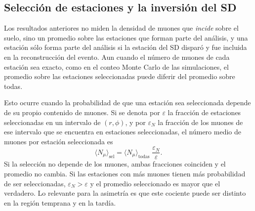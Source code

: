 
\subsection{Selección de estaciones y la inversión del SD}
\label{subsec:seleccion_estaciones}

Los resultados anteriores no miden la densidad de muones que \textit{incide} sobre el suelo, sino un promedio sobre las estaciones que forman parte del análisis, y una estación sólo forma parte del análisis si la estación del SD disparó y fue incluida en la reconstrucción del evento. Aun cuando el número de muones de cada estación sea exacto, como en el conteo Monte Carlo de las simulaciones, el promedio sobre las estaciones seleccionadas puede diferir del promedio sobre todas.

Esto ocurre cuando la probabilidad de que una estación sea seleccionada depende de su propio contenido de muones. Si se denota por $\varepsilon$ la fracción de estaciones seleccionadas en un intervalo de $(r,\phi)$, y por $\varepsilon_N$ la fracción de los muones de ese intervalo que se encuentra en estaciones seleccionadas, el número medio de muones por estación seleccionada es
\begin{equation}
	\langle N_\mu \rangle_{\text{sel}} = \langle N_\mu \rangle_{\text{todas}}\;\frac{\varepsilon_N}{\varepsilon}.
	\label{eq:seleccion}
\end{equation}
Si la selección no depende de los muones, ambas fracciones coinciden y el promedio no cambia. Si las estaciones con más muones tienen más probabilidad de ser seleccionadas, $\varepsilon_N > \varepsilon$ y el promedio seleccionado es mayor que el verdadero. Lo relevante para la asimetría es que este cociente puede ser distinto en la región temprana y en la tardía.

